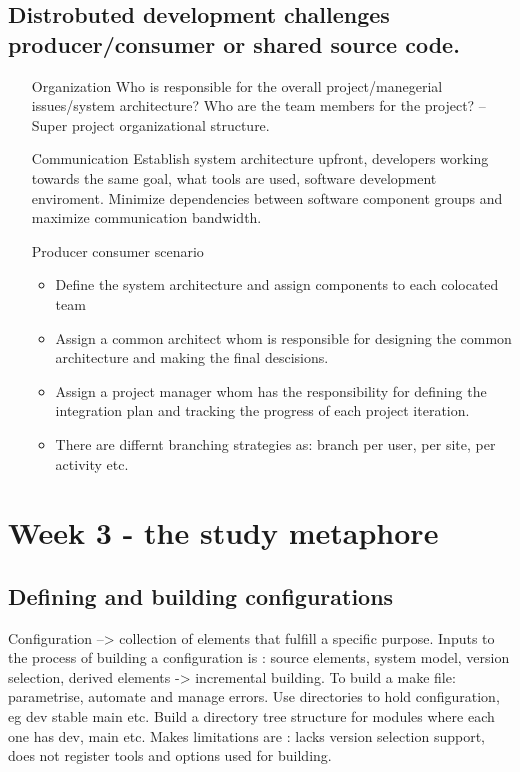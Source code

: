 \documentclass{article}
\begin{document}
\begin{itemize}
\begin{itemize}
    \subsection{Distrobuted development challenges producer/consumer or shared source code.}
    \begin{itemize}
    \item[Organization] Who is responsible for the overall project/manegerial issues/system architecture? Who are the team members for the project? -- Super project organizational structure.
    \item[Communication] Establish system architecture upfront, developers working towards the same goal, what tools are used, software development enviroment. Minimize dependencies between software component groups and maximize communication bandwidth.
    \item[Producer consumer scenario]
    \begin{itemize}
    \item Define the system architecture and assign components to each colocated team
    \item Assign a common architect whom is responsible for designing the common architecture and making the final descisions.
    \item Assign a project manager whom has the responsibility for defining the integration plan and tracking the progress of each project iteration.
    \item There are differnt branching strategies as: branch per user, per site, per activity etc.
    \end{itemize}
    \end{itemize}

    \section{ Week 3 - the study metaphore}
    \subsection{Defining and building configurations} 
    Configuration --> collection of elements that fulfill a specific purpose. Inputs to the process of building a configuration is : source elements, system model, version selection, derived elements -> incremental building.
    To build a make file: parametrise, automate and manage errors. Use directories to hold configuration, eg dev stable main etc. Build a directory tree structure for modules where each one has dev, main etc.
    Makes limitations are : lacks version selection support, does not register tools and options used for building.


\end{itemize}
\end{itemize}
\end{document}
